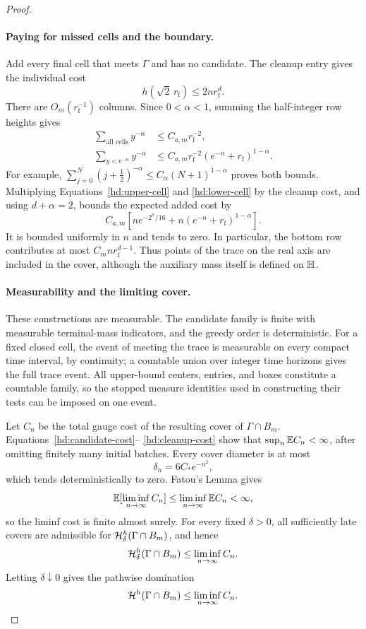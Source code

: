 \begin{proof}
\paragraph{Paying for missed cells and the boundary.}
Add every final cell that meets $\Gamma$ and has no candidate.
The cleanup entry gives the individual cost
\[
 h(\sqrt2\,r_{\mathrm f})\le2n r_{\mathrm f}^d.
\]
There are \(O_m(r_{\mathrm f}^{-1})\) columns. Since
\(0<\alpha<1\), summing the half-integer row heights gives
\begin{align*}
 \sum_{\text{all cells}}y^{-\alpha}
     &\le C_{a,m}r_{\mathrm f}^{-2},\\
 \sum_{y<e^{-n}}y^{-\alpha}
     &\le C_{a,m}r_{\mathrm f}^{-2}
                        (e^{-n}+r_{\mathrm f})^{1-\alpha}.
\end{align*}
For example,
\(\sum_{j=0}^N(j+\tfrac12)^{-\alpha}
\le C_\alpha(N+1)^{1-\alpha}\) proves both bounds.
Multiplying Equations~\eqref{hd:upper-cell} and
\eqref{hd:lower-cell} by the cleanup cost, and using
\(d+\alpha=2\), bounds the expected added cost by
\begin{equation}
 C_{a,m}\left[
       n e^{-2^n/16}
       +n(e^{-n}+r_{\mathrm f})^{1-\alpha}
       \right].
 \label{hd:cleanup-cost}
\end{equation}
It is bounded uniformly in \(n\) and tends to zero.
In particular, the bottom row contributes at most
\(C_m n r_{\mathrm f}^{d-1}\). Thus points of the trace on
the real axis are included in the cover, although the auxiliary
mass itself is defined on \(\mathbb H\).

\paragraph{Measurability and the limiting cover.}
These constructions are measurable. The candidate family is
finite with measurable terminal-mass indicators, and the
greedy order is deterministic. For a fixed closed cell, the
event of meeting the trace is measurable on every compact time
interval, by continuity; a countable union over integer time
horizons gives the full trace event.
All upper-bound centers, entries, and boxes constitute a
countable family, so the stopped measure identities used in
constructing their tests can be imposed on one event.

Let \(C_n\) be the total gauge cost of the resulting cover of
\(\Gamma\cap B_m\). Equations~\eqref{hd:candidate-cost}--%
\eqref{hd:cleanup-cost} show that
\(\sup_n\mathbb E C_n<\infty\), after omitting finitely many initial
batches. Every cover diameter is at most
\[
 \delta_n=6C_*e^{-n^2},
\]
which tends deterministically to zero.
Fatou's Lemma gives
\[
 \mathbb E[\liminf_{n\to\infty}C_n]
 \le\liminf_{n\to\infty}\mathbb E C_n<\infty,
\]
so the liminf cost is finite almost surely.
For every fixed \(\delta>0\), all sufficiently late covers are
admissible for \(\mathcal H^h_\delta(\Gamma\cap B_m)\), and hence
\[
 \mathcal H^h_\delta(\Gamma\cap B_m)
 \le\liminf_{n\to\infty}C_n.
\]
Letting $\delta\downarrow0$ gives the pathwise domination
\begin{equation}
 \mathcal H^h(\Gamma\cap B_m)\le\liminf_{n\to\infty}C_n.
 \label{hd:liminf-domination}
\end{equation}


\end{proof}
